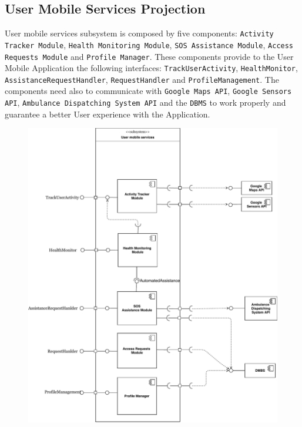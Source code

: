 \documentclass[12pt,a4paper]{article}
\begin{document}
	\newpage
	\subsection{User Mobile Services Projection}
	User mobile services subsystem is composed by five components: \texttt{Activity Tracker Module}, \texttt{Health Monitoring Module}, \texttt{SOS Assistance Module}, \texttt{Access Requests Module} and \texttt{Profile Manager}. These components provide to the User Mobile Application the following interfaces: \texttt{TrackUserActivity}, \texttt{HealthMonitor}, \texttt{AssistanceRequestHandler}, \texttt{RequestHandler} and \texttt{ProfileManagement}. The components need also to communicate with \texttt{Google Maps API}, \texttt{Google Sensors API}, \texttt{Ambulance Dispatching System API} and the \texttt{DBMS} to work properly and guarantee a better User experience with the Application. 
	\begin{figure}[H]
		\centering
		\includegraphics[height=1.0\linewidth]{images/user_projection}
		\label{fig:userprojection}
	\end{figure}
	\newpage
\end{document}
